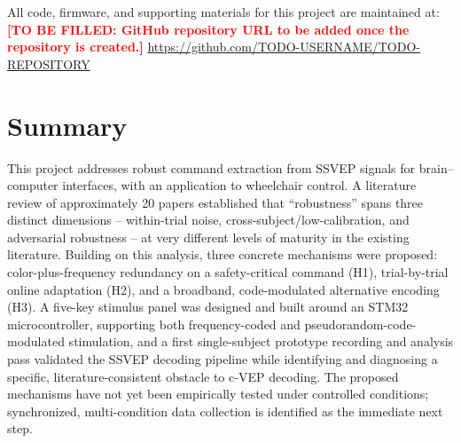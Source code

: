 \documentclass[11pt]{article}
\newcommand{\todofill}[1]{\textcolor{red}{\textbf{[TO BE FILLED: #1]}}}
\begin{document}
All code, firmware, and supporting materials for this project are maintained at: \todofill{GitHub repository URL to be added once the repository is created.} \url{https://github.com/TODO-USERNAME/TODO-REPOSITORY}




\newpage
\section*{Summary}

This project addresses robust command extraction from SSVEP signals for brain--computer interfaces, with an application to wheelchair control. A literature review of approximately 20 papers established that ``robustness'' spans three distinct dimensions -- within-trial noise, cross-subject/low-calibration, and adversarial robustness -- at very different levels of maturity in the existing literature. Building on this analysis, three concrete mechanisms were proposed: color-plus-frequency redundancy on a safety-critical command (H1), trial-by-trial online adaptation (H2), and a broadband, code-modulated alternative encoding (H3). A five-key stimulus panel was designed and built around an STM32 microcontroller, supporting both frequency-coded and pseudorandom-code-modulated stimulation, and a first single-subject prototype recording and analysis pass validated the SSVEP decoding pipeline while identifying and diagnosing a specific, literature-consistent obstacle to c-VEP decoding. The proposed mechanisms have not yet been empirically tested under controlled conditions; synchronized, multi-condition data collection is identified as the immediate next step.
\end{document}
